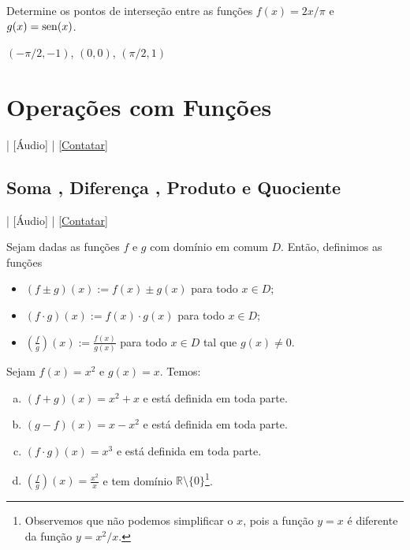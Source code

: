 \begin{exer}
  Determine os pontos de interseção entre as funções $f(x)=2x/\pi$ e $g(x)=\operatorname{sen}(x)$.
\end{exer}
\begin{resp}
  $(-\pi/2, -1)$, $(0,0)$, $(\pi/2, 1)$
\end{resp}

\section{Operações com Funções}\label{cap_funcao_sec_opfun}

\begin{flushright}
  [Vídeo] | [Áudio] | \href{https://phkonzen.github.io/notas/contato.html}{[Contatar]}
\end{flushright}

\subsection{Soma , Diferença , Produto  e Quociente }

\begin{flushright}
  [Vídeo] | [Áudio] | \href{https://phkonzen.github.io/notas/contato.html}{[Contatar]}
\end{flushright}

Sejam dadas as funções $f$ e $g$ com domínio em comum $D$. Então, definimos as funções
\begin{itemize}
\item $(f\pm g)(x) := f(x) \pm g(x)$ para todo $x\in D$;
\item $(f\cdot g)(x) := f(x)\cdot g(x)$ para todo $x\in D$;
\item $\displaystyle \left(\frac{f}{g}\right)(x) := \frac{f(x)}{g(x)}$ para todo $x\in D$ tal que $g(x)\neq 0$.
\end{itemize}

\begin{ex}
  Sejam $f(x)=x^2$ e $g(x)=x$. Temos:
  \begin{enumerate}[a)]
  \item $(f+g)(x) = x^2 + x$ e está definida em toda parte.
  \item $(g-f)(x) = x - x^2$ e está definida em toda parte.
  \item $(f\cdot g)(x) = x^3$ e está definida em toda parte.
  \item $\displaystyle \left(\frac{f}{g}\right)(x) = \frac{x^2}{x}$ e tem domínio $\mathbb{R}\setminus \{0\}$\footnote{Observemos que não podemos simplificar o $x$, pois a função $y=x$ é diferente da função $y=x^2/x$.}.
  \end{enumerate}
\end{ex}

